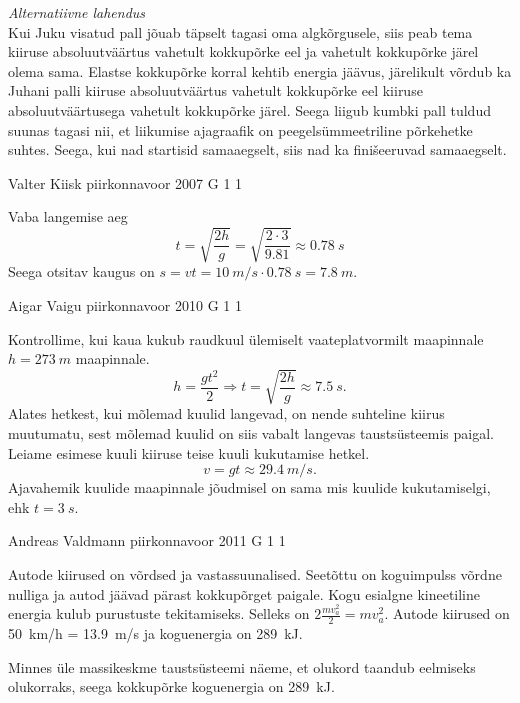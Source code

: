 \documentclass[11pt]{article}
\begin{document}
{{\vspace{0.5\baselineskip}

\emph{Alternatiivne lahendus}\\
Kui Juku visatud pall jõuab täpselt tagasi oma algkõrgusele, siis peab tema kiiruse absoluutväärtus vahetult kokkupõrke eel ja vahetult kokkupõrke järel olema sama. Elastse kokkupõrke korral kehtib energia jäävus, järelikult võrdub ka Juhani palli kiiruse absoluutväärtus vahetult kokkupõrke eel kiiruse absoluutväärtusega vahetult kokkupõrke järel. Seega liigub kumbki pall tuldud suunas tagasi nii, et liikumise ajagraafik on peegelsümmeetriline põrkehetke suhtes. Seega, kui nad startisid samaaegselt, siis nad ka finišeeruvad samaaegselt.
\fi
}

{Valter Kiisk} %
{piirkonnavoor} %
{2007} %
{G 1} %
{1} %
{

\ifSolution
Vaba langemise aeg
\[
t=\sqrt{\frac{2 h}{g}}=\sqrt{\frac{2 \cdot 3}{\num{9,81}}} \approx \SI{0,78}{s}
\]
Seega otsitav kaugus on $s = vt = \SI{10}{m/s} \cdot \SI{0,78}{s} = \SI{7,8}{m}$.
\fi
}

{Aigar Vaigu} %
{piirkonnavoor} %
{2010} %
{G 1} %
{1} %
{

\ifSolution
Kontrollime, kui kaua kukub raudkuul ülemiselt vaateplatvormilt maapinnale $h=\SI{273}{m}$ maapinnale.
\[h=\frac{gt^2}{2} \Rightarrow t=\sqrt{\frac{2h}{g}}\approx \SI{7.5}{s}.\]
Alates hetkest, kui mõlemad kuulid langevad, on nende suhteline kiirus muutumatu, sest mõlemad kuulid on siis vabalt langevas taustsüsteemis paigal.
Leiame esimese kuuli kiiruse teise kuuli kukutamise hetkel.
\[v=gt\approx \SI{29.4}{m/s}.\]
Ajavahemik kuulide maapinnale jõudmisel on sama mis kuulide kukutamiselgi, ehk $t=\SI{3}{s}$.
\fi
}

{Andreas Valdmann} %
{piirkonnavoor} %
{2011} %
{G 1} %
{1} %
{

\ifSolution
\osa Autode kiirused on võrdsed ja vastassuunalised. Seetõttu on koguimpulss võrdne nulliga ja autod jäävad pärast kokkupõrget paigale. Kogu esialgne kineetiline energia kulub purustuste tekitamiseks. Selleks on $2 \frac{m v_{a}^{2}}{2}=m v_{a}^{2}$. Autode kiirused on \SI{50}{km/h} = \SI{13,9}{m/s} ja koguenergia on \SI{289}{kJ}.

\osa Minnes üle massikeskme taustsüsteemi näeme, et olukord taandub eelmiseks olukorraks, seega kokkupõrke koguenergia on \SI{289}{kJ}.

}}
\end{document}
